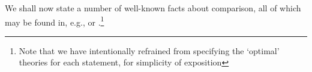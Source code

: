 



We shall now state a number of well-known facts about comparison, all of which may be found in, e.g., \cite{Simpson99:monograph} or \cite{hirst05:ord-arith-rm-survey}.\footnote{Note that we have intentionally refrained from specifying the `optimal' theories for each statement, for simplicity of exposition}

